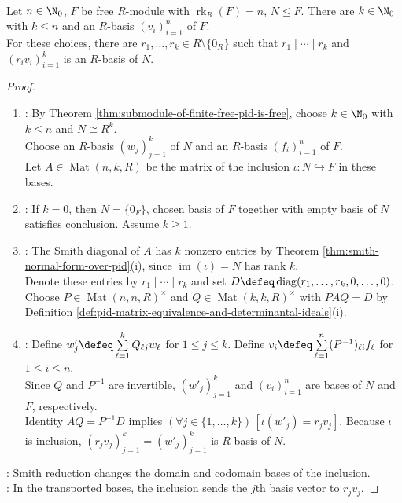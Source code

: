 \begin{theorem} \label{thm:adapted-basis-submodule-free-pid} \\
Let $n\in\N_0$, $F$ be free $R$-module with $\operatorname{rk}_R(F)=n$, $N\leq F$. There are $k\in\N_0$ with $k\leq n$ and an $R$-basis $(v_i)_{i=1}^n$ of $F$.\\
For these choices, there are $r_1,\ldots,r_k\in R\setminus\{0_R\}$ such that $r_1\mid\cdots\mid r_k$ and $(r_iv_i)_{i=1}^k$ is an $R$-basis of $N$.
\begin{proof}
\begin{enumerate}[label=(\roman*)]
\setlength{\itemsep}{0pt}
\item {}: By Theorem \ref{thm:submodule-of-finite-free-pid-is-free}, choose $k\in\N_0$ with $k\leq n$ and $N\cong R^k$.\\
Choose an $R$-basis $(w_j)_{j=1}^k$ of $N$ and an $R$-basis $(f_i)_{i=1}^n$ of $F$.\\
Let $A\in\operatorname{Mat}(n,k,R)$ be the matrix of the inclusion $\iota:N\hookrightarrow F$ in these bases.
\item {}: If $k=0$, then $N=\{0_F\}$, chosen basis of $F$ together with empty basis of $N$ satisfies conclusion. Assume $k\geq1$.
\item {}: The Smith diagonal of $A$ has $k$ nonzero entries by Theorem \ref{thm:smith-normal-form-over-pid}(i), since $\operatorname{im}(\iota)=N$ has rank $k$.\\
Denote these entries by $r_1\mid\cdots\mid r_k$ and set $D\defeq\operatorname{diag}(r_1,\ldots,r_k,0,\ldots,0)$.\\
Choose $P\in\operatorname{Mat}(n,n,R)^\times$ and $Q\in\operatorname{Mat}(k,k,R)^\times$ with $PAQ=D$ by Definition \ref{def:pid-matrix-equivalence-and-determinantal-ideals}(i).
\item {}: Define $w'_j\defeq\sum\limits_{\ell=1}^kQ_{\ell j}w_\ell$ for $1\leq j\leq k$. Define $v_i\defeq\sum\limits_{\ell=1}^n(P^{-1})_{\ell i}f_\ell$ for $1\leq i\leq n$.\\
Since $Q$ and $P^{-1}$ are invertible, $(w'_j)_{j=1}^k$ and $(v_i)_{i=1}^n$ are bases of $N$ and $F$, respectively.\\
Identity $AQ=P^{-1}D$ implies $(\forall j\in\{1,\ldots,k\})\,[\iota(w'_j)=r_jv_j]$. Because $\iota$ is inclusion, $(r_jv_j)_{j=1}^k=(w'_j)_{j=1}^k$ is $R$-basis of $N$.
\end{enumerate}
: Smith reduction changes the domain and codomain bases of the inclusion.\\
: In the transported bases, the inclusion sends the $j$th basis vector to $r_jv_j$.
\end{proof}
\end{theorem}

